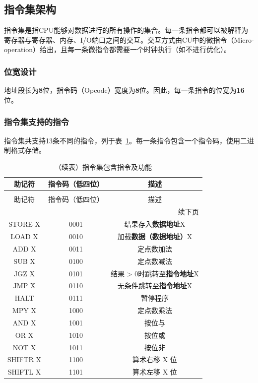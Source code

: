 \documentclass[lang=cn,a4paper,newtx]{elegantpaper}
\begin{document}
\subsection{指令集架构}
指令集是指CPU能够对数据进行的所有操作的集合。每一条指令都可以被解释为寄存器与寄存器、内存、I/O端口之间的交互。交互方式由CU中的微指令（Micro-operation）给出，且每一条微指令都需要一个时钟执行（如不进行优化）。
\subsubsection{位宽设计}
地址段长为\textbf{8}位，指令码（Opcode）宽度为\textbf{8}位。因此，每一条指令的位宽为\textbf{16}位。


\subsubsection{指令集支持的指令}
指令集共支持13条不同的指令，列于表~\ref{tab:ISA:instructions}。每一条指令包含一个指令码，使用二进制格式存储。
  


\begin{longtable}{c c c}
  \caption{指令集包含指令及功能} \label{tab:ISA:instructions} \\
  \toprule
  助记符  & 指令码（低四位） & 描述 \\
  \midrule
  \endfirsthead
  
  \caption[]{（续表）指令集包含指令及功能} \\
  \toprule
  助记符  & 指令码（低四位） & 描述 \\
  \midrule
  \endhead
  
  \midrule
  \multicolumn{3}{r}{续下页} \\
  \midrule
  \endfoot
  
  \bottomrule
  \endlastfoot
  
  STORE X &  0001   & 结果存入\textbf{数据地址}X \\
  LOAD X  & 0010    & 加载\textbf{数据（数据地址）}X \\
  ADD X   & 0011    & 定点数加法\\
  SUB X   & 0100  & 定点数减法\\
  JGZ X   & 0101    & 结果 > 0时跳转至\textbf{指令地址}X\\
  JMP X   & 0110    & 无条件跳转至\textbf{指令地址}X\\
  HALT    & 0111    & 暂停程序\\
  MPY X   & 1000    & 定点数乘法 \\
  AND X   & 1001    & 按位与\\
  OR X    & 1010    & 按位或\\
  NOT X   & 1011    & 按位非 \\
  SHIFTR X & 1100    & 算术右移 X 位\\
  SHIFTL X & 1101    & 算术左移 X 位\\
\end{longtable}
\end{document}
